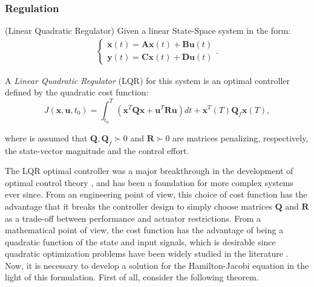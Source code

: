 \documentclass[a4paper,11pt]{book}
\numberwithin{figure}{chapter}
\numberwithin{equation}{chapter}
\numberwithin{table}{chapter}
\theoremstyle{definition}
\newtheorem{definition}{Definition}[chapter]
\newcounter{boxed-theorem}
\newcounter{boxed-lemma}
\newcounter{boxed-definition}
\newenvironment{boxed-definition}[1]
{\colorlet{shadecolor}{pastelYellow!15} \begin{shaded} \begin{definition}{#1}}
{\end{definition} \end{shaded}}
\newcounter{boxed-example}
\begin{document}
\subsubsection{Regulation}

\begin{boxed-definition}{(Linear Quadratic Regulator)} \label{def:lqr}
    Given a linear State-Space system in the form:
    \begin{align}
    \begin{cases}
        \dot{\bm{x}}(t) = \bm{A} \bm{x}(t) + \bm{B} \bm{u}(t) \\
        \bm{y}(t) = \bm{C} \bm{x}(t) + \bm{D} \bm{u}(t)
    \end{cases}
    .\end{align}
    
    A \textit{Linear Quadratic Regulator} (LQR) for this system is an optimal controller defined by the quadratic cost function:
    \begin{equation}
        J(\bm{x}, \bm{u}, t_0) = \int_{t_0}^{T} \left( \bm{x}^T \bm{Q} \bm{x} + \bm{u}^T \bm{R} \bm{u} \right) dt + \bm{x}^T(T) \bm{Q}_f \bm{x}(T)
    ,\end{equation}
    
    \noindent where is assumed that $\bm{Q},\bm{Q}_f  \succ 0$ and $\bm{R} \succ 0$ are matrices penalizing, respectively, the state-vector magnitude and the control effort.
\end{boxed-definition}

The LQR optimal controller was a major breakthrough in the development of optimal control theory \cite{Bryson:1996}, and has been a foundation for more complex systems ever since. From an engineering point of view, this choice of cost function has the advantage that it breaks the controller design to simply choose matrices $\bm{Q}$ and $\bm{R}$ as a trade-off between performance and actuator restrictions. From a mathematical point of view, the cost function has the advantage of being a quadratic function of the state and input signals, which is desirable since quadratic optimization problems have been widely studied in the literature \cite{Boyd:2004}. Now, it is necessary to develop a solution for the Hamilton-Jacobi equation in the light of this formulation. First of all, consider the following theorem.
\end{document}
